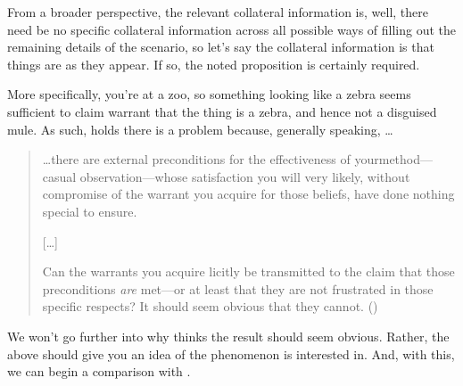 \begin{note}
  From a broader perspective, the relevant collateral information is, well, there need be no specific collateral information across all possible ways of filling out the remaining details of the scenario, so let's say the collateral information is that things are as they appear.
  If so, the noted proposition is certainly required.

  More specifically, you're at a zoo, so something looking like a zebra seems sufficient to claim warrant that the thing is a zebra, and hence not a disguised mule.
  As such, \citeauthor{Wright:2000tq} holds there is a problem because, generally speaking, \dots

  \begin{quote}
    \dots\space there are external preconditions for the effectiveness of your\linebreak method---casual observation---whose satisfaction you will very likely, without compromise of the warrant you acquire for those beliefs, have done nothing special to ensure.

    [\dots]

    Can the warrants you acquire licitly be transmitted to the claim that those preconditions \emph{are} met---or at least that they are not frustrated in those specific respects?
    It should seem obvious that they cannot.\linebreak
    \mbox{}\hfill\mbox{(\Citeyear[154]{Wright:2000tq})}
  \end{quote}
  We won't go further into why \citeauthor{Wright:2000tq} thinks the result should seem obvious.
  Rather, the above should give you an idea of the phenomenon \citeauthor{Wright:2000tq} is interested in.
  And, with this, we can begin a comparison with \nI{}.
\end{note}

